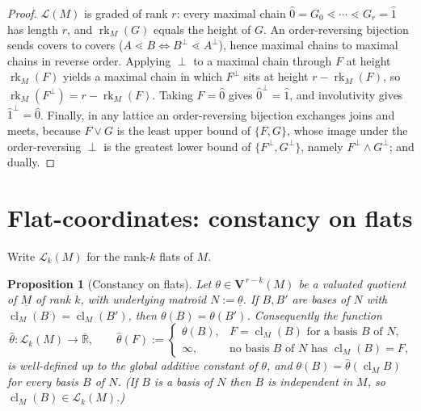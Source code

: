 \documentclass{article}
\newtheorem{proposition}[theorem]{Proposition}
\theoremstyle{definition}
\newcommand{\Rbar}{\overline{\mathbb{R}}}
\newcommand{\rk}{\operatorname{rk}}
\newcommand{\cl}{\operatorname{cl}}
\newcommand{\bV}{\mathbf V}
\newcommand{\cLL}{\mathcal{L}}
\begin{document}
\begin{proof}
$\cLL(M)$ is graded of rank $r$: every maximal chain $\hat0=G_0\lessdot\cdots\lessdot G_r=\hat1$ has
length $r$, and $\rk_M(G)$ equals the height of $G$. An order-reversing bijection sends covers to
covers ($A\lessdot B\iff B^{\perp}\lessdot A^{\perp}$), hence maximal chains to maximal chains in
reverse order. Applying $\perp$ to a maximal chain through $F$ at height $\rk_M(F)$ yields a maximal
chain in which $F^{\perp}$ sits at height $r-\rk_M(F)$, so $\rk_M(F^{\perp})=r-\rk_M(F)$. Taking
$F=\hat0$ gives $\hat0^{\perp}=\hat1$, and involutivity gives $\hat1^{\perp}=\hat0$. Finally, in any
lattice an order-reversing bijection exchanges joins and meets, because $F\vee G$ is the least upper
bound of $\{F,G\}$, whose image under the order-reversing $\perp$ is the greatest lower bound of
$\{F^{\perp},G^{\perp}\}$, namely $F^{\perp}\wedge G^{\perp}$; and dually.
\end{proof}

\section{Flat-coordinates: constancy on flats}

Write $\cLL_k(M)$ for the rank-$k$ flats of $M$.

\begin{proposition}[Constancy on flats]\label{prop:constancy}
Let $\theta\in\bV^{\,r-k}(M)$ be a valuated quotient of $\underline M$ of rank $k$, with underlying
matroid $N:=\underline\theta$. If $B,B'$ are bases of $N$ with $\cl_M(B)=\cl_M(B')$, then
$\theta(B)=\theta(B')$. Consequently the function
\begin{equation}\label{eqn:hat-def}
  \widehat\theta\colon\cLL_k(M)\to\Rbar,\qquad
  \widehat\theta(F):=\begin{cases}\theta(B), & \text{$F=\cl_M(B)$ for a basis $B$ of $N$},\\
  \infty, & \text{no basis $B$ of $N$ has $\cl_M(B)=F$,}\end{cases}
\end{equation}
is well-defined up to the global additive constant of $\theta$, and $\theta(B)=\widehat\theta(\cl_M
B)$ for every basis $B$ of $N$. (If $B$ is a basis of $N$ then $B$ is independent in $M$, so
$\cl_M(B)\in\cLL_k(M)$.)
\end{proposition}
\end{document}
